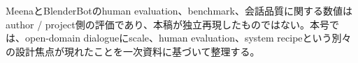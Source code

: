 \begin{claimboundary}
MeenaとBlenderBotのhuman evaluation、benchmark、会話品質に関する数値はauthor / project側の評価であり、本稿が独立再現したものではない。本号では、open-domain dialogueにscale、human evaluation、system recipeという別々の設計焦点が現れたことを一次資料に基づいて整理する。\autocite{src-66cb10bf43ff,src-8260c320e205,src-8930f1933983}
\end{claimboundary}
